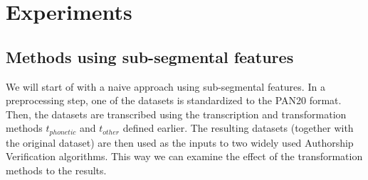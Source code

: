 \chapter{Experiments}\label{experiments}
\section{Methods using sub-segmental features}
We will start of with a naive approach using sub-segmental features.
In a preprocessing step, one of the datasets is standardized to the PAN20 format.
Then, the datasets are transcribed using the transcription and transformation methods $t_{phonetic}$ and $t_{other}$ defined earlier.
The resulting datasets (together with the original dataset) are then used as the inputs to two widely used Authorship Verification algorithms.
This way we can examine the effect of the transformation methods to the results.
%

